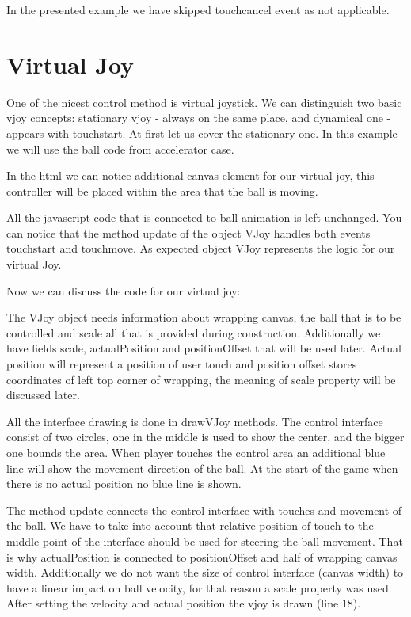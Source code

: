 In the presented example we have skipped touchcancel event as not applicable.

\section{Virtual Joy}
One of the nicest control method is virtual joystick. We can distinguish two basic vjoy concepts: stationary vjoy - always on the same place, and dynamical one - appears with touchstart. At first let us cover the stationary one. In this example we will use the ball code from accelerator case.


In the html we can notice additional canvas element for our virtual joy, this controller will be placed within the area that the ball is moving.



\begin{explain}
All the javascript code that is connected to ball animation is left unchanged. You can notice that the method update  of the object VJoy handles both events touchstart and touchmove. As expected object VJoy represents the logic for our virtual Joy.
\end{explain}

Now we can discuss the code for  our virtual joy:


%

\begin{explain}
The VJoy object needs information about wrapping canvas, the ball that is to be controlled and scale all that is provided during construction. Additionally we have fields scale, actualPosition and positionOffset that will be used later. Actual position will represent a position of user touch and position offset stores coordinates of left top corner of wrapping, the meaning of scale property will be discussed later.

All the interface drawing is done in drawVJoy methods. The control interface consist of two circles, one in the middle is used to show the center, and the bigger one bounds the area. When player touches the control area an additional blue line will show the movement direction of the ball. At the start of the game when there is no actual position no blue line is shown.

The method update connects the control interface with touches and movement of the ball. We have to take into account that relative position of touch to the middle point of the interface should be used for steering the ball movement. That is why actualPosition is connected to positionOffset and half of wrapping canvas width. Additionally we do not want the size of control interface (canvas width) to have a linear impact on ball velocity, for that reason a scale property was used. After setting the velocity and actual position the vjoy is drawn (line 18).
 \end{explain}

